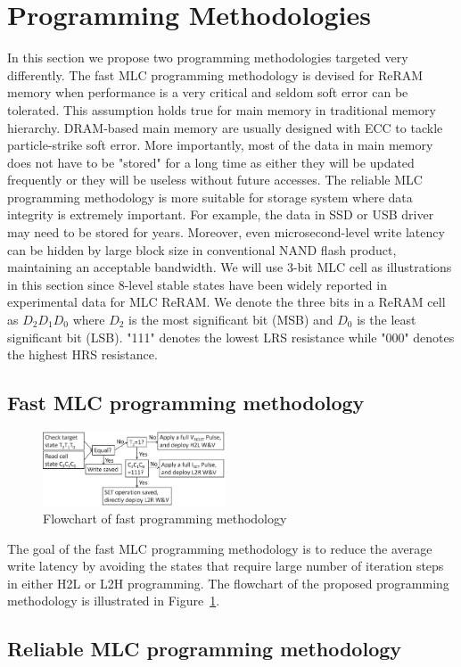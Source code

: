 \section{Programming Methodologies} \label{sec:programming}

In this section we propose two programming methodologies targeted very differently. The fast MLC programming methodology is devised for ReRAM memory when performance is a very critical and seldom soft error can be tolerated. This assumption holds true for main memory in traditional memory hierarchy. DRAM-based main memory are usually designed with ECC to tackle particle-strike soft error. More importantly, most of the data in main memory does not have to be "stored" for a long time as either they will be updated frequently or they will be useless without future accesses. The reliable MLC programming methodology is more suitable for storage system where data integrity is extremely important. For example, the data in SSD or USB driver may need to be stored for years. Moreover, even microsecond-level write latency can be hidden by large block size in conventional NAND flash product, maintaining an acceptable bandwidth. We will use 3-bit MLC cell as illustrations in this section since 8-level stable states have been widely reported in experimental data for MLC ReRAM. We denote the three bits in a ReRAM cell as $D_2D_1D_0$ where $D_2$ is the most significant bit (MSB) and $D_0$ is the least significant bit (LSB). "111" denotes the lowest LRS resistance while "000" denotes the highest HRS resistance. 

\subsection{Fast MLC programming methodology}

\begin{figure}[t]
\centering
\includegraphics[width=0.48\textwidth]{fig/fastprog}
\vspace{-10pt}
\caption{Flowchart of fast programming methodology}
\label{fig:fastprog}
\vspace{-15pt}
\end{figure}

The goal of the fast MLC programming methodology is to reduce the average write latency by avoiding the states that require large number of iteration steps in either H2L or L2H programming. The flowchart of the proposed programming methodology is illustrated in Figure~\ref{fig:fastprog}.   


\subsection{Reliable MLC programming methodology}



